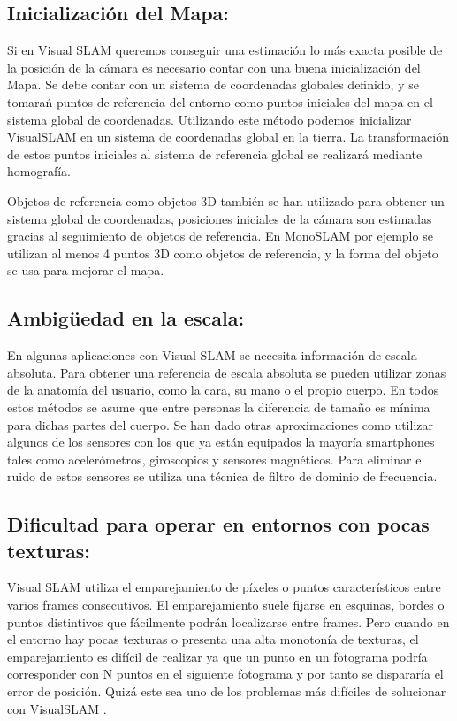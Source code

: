 \subsection{Inicialización del Mapa:}

Si en Visual SLAM queremos conseguir una estimación lo más exacta posible de la posición de la cámara es necesario contar con una buena inicialización del Mapa. Se debe contar con un sistema de coordenadas globales definido, y se tomarań puntos de referencia del entorno como puntos iniciales del mapa en el sistema global de coordenadas. Utilizando este método podemos inicializar VisualSLAM en un sistema de coordenadas global en la tierra. La transformación de estos puntos iniciales al sistema de referencia global se realizará mediante homografía.

Objetos de referencia como objetos 3D también se han utilizado para obtener un sistema global de coordenadas, posiciones iniciales de la cámara son estimadas gracias al seguimiento de objetos de referencia.
En MonoSLAM por ejemplo se utilizan al menos 4 puntos 3D como objetos de referencia, y la forma del objeto se usa para mejorar el mapa.

\subsection{Ambigüedad en la escala:}

En algunas aplicaciones con Visual SLAM se necesita información de escala absoluta. Para obtener una referencia de escala absoluta se pueden utilizar zonas de la anatomía del usuario, como la cara, su mano o el propio cuerpo. En todos estos métodos se asume que entre personas la diferencia de tamaño es mínima para dichas partes del cuerpo. Se han dado otras aproximaciones como utilizar algunos de los sensores con los que ya están equipados la mayoría smartphones tales como acelerómetros, giroscopios y sensores magnéticos. Para eliminar el ruido de estos sensores se utiliza una técnica de filtro de dominio de frecuencia.


\subsection{Dificultad para operar en entornos con pocas texturas:}

Visual SLAM utiliza el emparejamiento de píxeles o puntos característicos entre varios frames consecutivos. El emparejamiento suele fijarse en esquinas, bordes  o puntos distintivos que fácilmente podrán localizarse entre frames. Pero cuando en el entorno hay pocas texturas o presenta una alta monotonía de texturas,  el emparejamiento es difícil de realizar ya que un punto en un fotograma podría corresponder con N puntos en el siguiente fotograma y por tanto se dispararía el error de posición. Quizá este sea uno de los problemas más difíciles de solucionar con VisualSLAM
\cite{Takafumi17}.



\flushbottom
\clearpage
\newpage
\pagebreak





